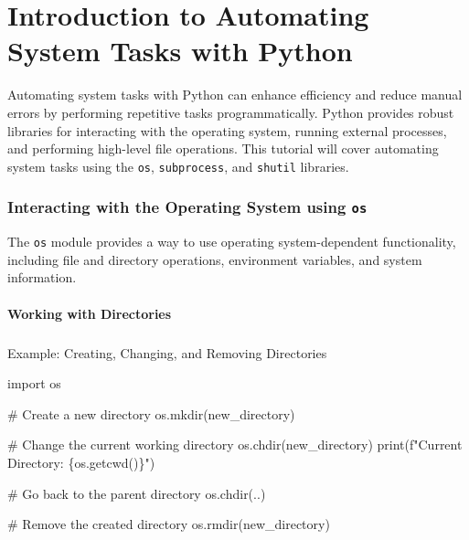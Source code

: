 \documentclass[
  letterpaper,
  DIV=11,
  numbers=noendperiod]{scrreprt}
\makeatletter
\let\oldparagraph\paragraph
\renewcommand{\paragraph}{
    \@ifstar
      \xxxParagraphStar
      \xxxParagraphNoStar
  }
\newcommand{\xxxParagraphStar}[1]{\oldparagraph*{#1}\mbox{}}
\newcommand{\xxxParagraphNoStar}[1]{\oldparagraph{#1}\mbox{}}
\newenvironment{Shaded}{\begin{snugshade}}{\end{snugshade}}
\newcommand{\BuiltInTok}[1]{\textcolor[rgb]{0.00,0.23,0.31}{#1}}
\newcommand{\CommentTok}[1]{\textcolor[rgb]{0.37,0.37,0.37}{#1}}
\newcommand{\ImportTok}[1]{\textcolor[rgb]{0.00,0.46,0.62}{#1}}
\newcommand{\NormalTok}[1]{\textcolor[rgb]{0.00,0.23,0.31}{#1}}
\newcommand{\SpecialCharTok}[1]{\textcolor[rgb]{0.37,0.37,0.37}{#1}}
\newcommand{\SpecialStringTok}[1]{\textcolor[rgb]{0.13,0.47,0.30}{#1}}
\newcommand{\StringTok}[1]{\textcolor[rgb]{0.13,0.47,0.30}{#1}}
\makeatother
\begin{document}

\chapter{Introduction to Automating System Tasks with
Python}\label{introduction-to-automating-system-tasks-with-python}

Automating system tasks with Python can enhance efficiency and reduce
manual errors by performing repetitive tasks programmatically. Python
provides robust libraries for interacting with the operating system,
running external processes, and performing high-level file operations.
This tutorial will cover automating system tasks using the \texttt{os},
\texttt{subprocess}, and \texttt{shutil} libraries.

\subsection{\texorpdfstring{Interacting with the Operating System using
\texttt{os}}{Interacting with the Operating System using os}}\label{interacting-with-the-operating-system-using-os}

The \texttt{os} module provides a way to use operating system-dependent
functionality, including file and directory operations, environment
variables, and system information.

\subsubsection{Working with Directories}\label{working-with-directories}

\paragraph{Example: Creating, Changing, and Removing
Directories}\label{example-creating-changing-and-removing-directories}

\begin{Shaded}
\begin{Highlighting}[]
\ImportTok{import}\NormalTok{ os}

\CommentTok{\# Create a new directory}
\NormalTok{os.mkdir(}\StringTok{\textquotesingle{}new\_directory\textquotesingle{}}\NormalTok{)}

\CommentTok{\# Change the current working directory}
\NormalTok{os.chdir(}\StringTok{\textquotesingle{}new\_directory\textquotesingle{}}\NormalTok{)}
\BuiltInTok{print}\NormalTok{(}\SpecialStringTok{f"Current Directory: }\SpecialCharTok{\{}\NormalTok{os}\SpecialCharTok{.}\NormalTok{getcwd()}\SpecialCharTok{\}}\SpecialStringTok{"}\NormalTok{)}

\CommentTok{\# Go back to the parent directory}
\NormalTok{os.chdir(}\StringTok{\textquotesingle{}..\textquotesingle{}}\NormalTok{)}

\CommentTok{\# Remove the created directory}
\NormalTok{os.rmdir(}\StringTok{\textquotesingle{}new\_directory\textquotesingle{}}\NormalTok{)}
\end{Highlighting}
\end{Shaded}
\end{document}
